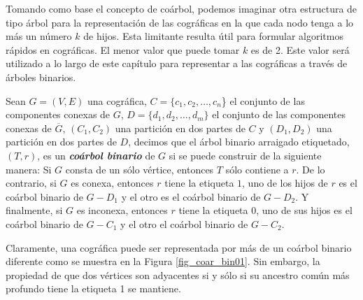 Tomando como base el concepto de coárbol, podemos imaginar otra estructura de
tipo árbol para la representación de las cográficas en la que cada nodo tenga a
lo más un número $k$ de hijos. Esta limitante resulta útil para formular
algoritmos rápidos en cográficas. El menor valor que puede tomar $k$ es de 2.
Este valor será utilizado a lo largo de este capítulo para representar a las
cográficas a través de árboles binarios. 


\begin{definition}{}

    Sean $G=(V,E)$ una cográfica, $C = \{c_1, c_2, \dots, c_n$\} el conjunto de
    las componentes conexas de $G$, $D = \{d_1, d_2, \dots, d_m\}$ el conjunto
    de las componentes conexas de $\overline{G}$, $(C_1, C_2)$ una partición en
    dos partes de $C$ y $(D_1, D_2)$ una partición en dos partes de $D$, decimos
    que el árbol binario arraigado etiquetado, $(T,r)$, es un
    \textbf{\emph{coárbol binario}} de $G$ si se puede construir de la siguiente
    manera: Si $G$ consta de un sólo vértice, entonces $T$ sólo contiene a $r$.
    De lo contrario, si $G$ es conexa, entonces $r$ tiene la etiqueta $1$, uno
    de los hijos de $r$ es el coárbol binario de $G-D_1$ y el otro es el coárbol
    binario de $G-D_2$. Y finalmente, si $G$ es inconexa, entonces $r$ tiene la
    etiqueta $0$, uno de sus hijos es el coárbol binario de $G-C_1$ y el otro el
    coárbol binario de $G-C_2$.

\end{definition}

Claramente, una cográfica puede ser representada por más de un coárbol binario
diferente como se muestra en la Figura \ref{fig_coar_bin01}. Sin embargo, la
propiedad de que dos vértices son adyacentes si y sólo si su ancestro común más
profundo tiene la etiqueta 1 se mantiene.

